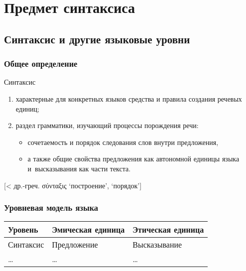 \section{Предмет синтаксиса}

\subsection{Синтаксис и другие языковые уровни}

\begin{frame}
  \frametitle{Общее определение}

  \begin{block}{Синтаксис}
    \begin{enumerate}
      \item характерные для конкретных языков средства и правила создания речевых единиц;
      \item раздел грамматики, изучающий процессы порождения речи: \begin{itemize}
        \item сочетаемость и порядок следования слов внутри предложения,
        \item а также общие свойства предложения как автономной единицы языка и~высказывания как части текста.
      \end{itemize}
    \end{enumerate}
    [< др.-греч. σύνταξις `построение', `порядок']
  \end{block}
\end{frame}

\begin{frame}
  \frametitle{Уровневая модель языка}

  \begin{table}[t]
    \begin{tabularx}{.9\textwidth}{XXX}
      Уровень & Эмическая единица & Этическая единица \\ \midrule \midrule
      Синтаксис & Предложение & Высказывание \\ \midrule
      \ldots & \ldots & \ldots \\
    \end{tabularx}
  \end{table}

\end{frame}

